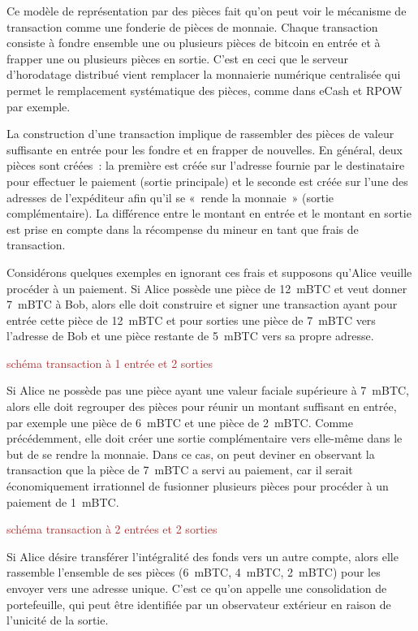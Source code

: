 Ce modèle de représentation par des pièces fait qu'on peut voir le mécanisme de transaction comme une fonderie de pièces de monnaie. Chaque transaction consiste à fondre ensemble une ou plusieurs pièces de bitcoin en entrée et à frapper une ou plusieurs pièces en sortie. C'est en ceci que le serveur d'horodatage distribué vient remplacer la monnaierie numérique centralisée qui permet le remplacement systématique des pièces, comme dans eCash et RPOW par exemple. %

La construction d'une transaction implique de rassembler des pièces de valeur suffisante en entrée pour les fondre et en frapper de nouvelles. En général, deux pièces sont créées~: la première est créée sur l'adresse fournie par le destinataire pour effectuer le paiement (sortie principale) et le seconde est créée sur l'une des adresses de l'expéditeur afin qu'il se «~rende la monnaie~» (sortie complémentaire). La différence entre le montant en entrée et le montant en sortie est prise en compte dans la récompense du mineur en tant que frais de transaction.

Considérons quelques exemples en ignorant ces frais et supposons qu'Alice veuille procéder à un paiement. Si Alice possède une pièce de 12~mBTC et veut donner 7~mBTC à Bob, alors elle doit construire et signer une transaction ayant pour entrée cette pièce de 12~mBTC et pour sorties une pièce de 7~mBTC vers l'adresse de Bob et une pièce restante de 5~mBTC vers sa propre adresse.

\textcolor{brown}{schéma transaction à 1 entrée et 2 sorties}

Si Alice ne possède pas une pièce ayant une valeur faciale supérieure à 7~mBTC, alors elle doit regrouper des pièces pour réunir un montant suffisant en entrée, par exemple une pièce de 6~mBTC et une pièce de 2~mBTC. Comme précédemment, elle doit créer une sortie complémentaire vers elle-même dans le but de se rendre la monnaie. Dans ce cas, on peut deviner en observant la transaction que la pièce de 7~mBTC a servi au paiement, car il serait économiquement irrationnel de fusionner plusieurs pièces pour procéder à un paiement de 1~mBTC.

\textcolor{brown}{schéma transaction à 2 entrées et 2 sorties}

Si Alice désire transférer l'intégralité des fonds vers un autre compte, alors elle rassemble l'ensemble de ses pièces (6~mBTC, 4~mBTC, 2~mBTC) pour les envoyer vers une adresse unique. C'est ce qu'on appelle une consolidation de portefeuille, qui peut être identifiée par un observateur extérieur en raison de l'unicité de la sortie.

